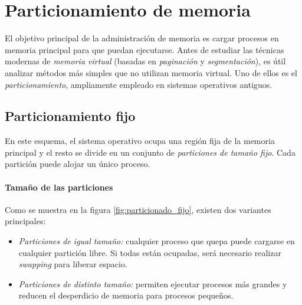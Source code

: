 \section{Particionamiento de memoria}

El objetivo principal de la administración de memoria es cargar procesos en memoria principal para que puedan ejecutarse. Antes de estudiar las técnicas modernas de \textit{memoria virtual} (basadas en \textit{paginación} y \textit{segmentación}), es útil analizar métodos más simples que no utilizan memoria virtual. Uno de ellos es el \textit{particionamiento}, ampliamente empleado en sistemas operativos antiguos.

\subsection{Particionamiento fijo}

En este esquema, el sistema operativo ocupa una región fija de la memoria principal y el resto se divide en un conjunto de \textit{particiones de tamaño fijo}. Cada partición puede alojar un único proceso.

\paragraph{Tamaño de las particiones}
Como se muestra en la figura \ref{fig:particionado_fijo}, existen dos variantes principales:
\begin{itemize}
  \item \textit{Particiones de igual tamaño:} cualquier proceso que quepa puede cargarse en cualquier partición libre. Si todas están ocupadas, será necesario realizar \textit{swapping} para liberar espacio.
  \item \textit{Particiones de distinto tamaño:} permiten ejecutar procesos más grandes y reducen el desperdicio de memoria para procesos pequeños.
\end{itemize}

